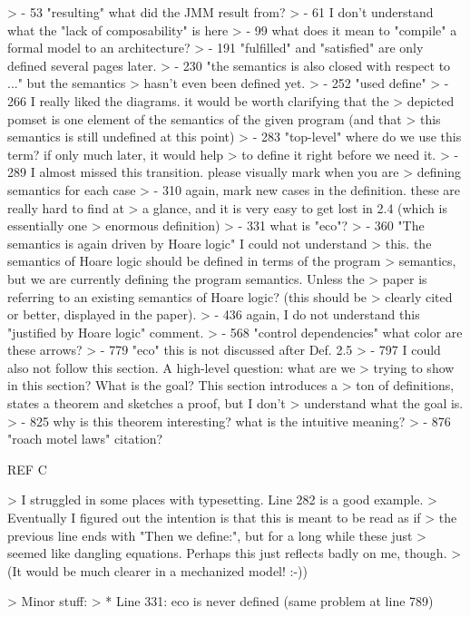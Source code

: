 \documentclass[acmsmall,review,screen]{acmart}\settopmatter{printfolios=true}
\theoremstyle{acmdefinition}
\begin{document}
> - 53 "resulting" what did the JMM result from?
> - 61 I don't understand what the "lack of composability" is here
> - 99 what does it mean to "compile" a formal model to an architecture?
> - 191 "fulfilled" and "satisfied" are only defined several pages later.
> - 230 "the semantics is also closed with respect to ..." but the semantics
>   hasn't even been defined yet.
> - 252 "used define"
> - 266 I really liked the diagrams. it would be worth clarifying that the
>   depicted pomset is one element of the semantics of the given program (and that
>   this semantics is still undefined at this point)
> - 283 "top-level" where do we use this term? if only much later, it would help
>   to define it right before we need it.
> - 289 I almost missed this transition. please visually mark when you are
>   defining semantics for each case
> - 310 again, mark new cases in the definition. these are really hard to find at
>   a glance, and it is very easy to get lost in 2.4 (which is essentially one
>   enormous definition)
> - 331 what is "eco"?
> - 360 "The semantics is again driven by Hoare logic" I could not understand
>   this. the semantics of Hoare logic should be defined in terms of the program
>   semantics, but we are currently defining the program semantics. Unless the
>   paper is referring to an existing semantics of Hoare logic? (this should be
>   clearly cited or better, displayed in the paper).
> - 436 again, I do not understand this "justified by Hoare logic" comment.
> - 568 "control dependencies" what color are these arrows?
> - 779 "eco" this is not discussed after Def. 2.5
> - 797 I could also not follow this section. A high-level question: what are we
>   trying to show in this section? What is the goal? This section introduces a
>   ton of definitions, states a theorem and sketches a proof, but I don't
>   understand what the goal is.
> - 825 why is this theorem interesting? what is the intuitive meaning?
> - 876 "roach motel laws" citation?





REF C

> I struggled in some places with typesetting. Line 282 is a good example.
> Eventually I figured out the intention is that this is meant to be read as if
> the previous line ends with "Then we define:", but for a long while these just
> seemed like dangling equations. Perhaps this just reflects badly on me, though.
> (It would be much clearer in a mechanized model! :-))

> Minor stuff:
> * Line 331: eco is never defined (same problem at line 789)
\end{document}
